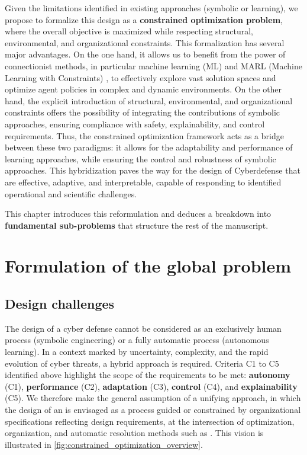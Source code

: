 Given the limitations identified in existing approaches (symbolic or learning), we propose to formalize this design as a \textbf{constrained optimization problem}, where the overall objective is maximized while respecting structural, environmental, and organizational constraints.
This formalization has several major advantages. On the one hand, it allows us to benefit from the power of connectionist methods, in particular machine learning (ML) and MARL (Machine Learning with Constraints) , to effectively explore vast solution spaces and optimize agent policies in complex and dynamic environments. On the other hand, the explicit introduction of structural, environmental, and organizational constraints offers the possibility of integrating the contributions of symbolic approaches, ensuring compliance with safety, explainability, and control requirements. Thus, the constrained optimization framework acts as a bridge between these two paradigms: it allows for the adaptability and performance of learning approaches, while ensuring the control and robustness of symbolic approaches. This hybridization paves the way for the design of Cyberdefense  that are effective, adaptive, and interpretable, capable of responding to identified operational and scientific challenges.

This chapter introduces this reformulation and deduces a breakdown into \textbf{fundamental sub-problems} that structure the rest of the manuscript.

\section{Formulation of the global problem}

\subsection{Design challenges}

The design of a cyber defense  cannot be considered as an exclusively human process (symbolic engineering) or a fully automatic process (autonomous learning). In a context marked by uncertainty, complexity, and the rapid evolution of cyber threats, a hybrid approach is required.
%
Criteria C1 to C5 identified above highlight the scope of the requirements to be met: \textbf{autonomy} (C1), \textbf{performance} (C2), \textbf{adaptation} (C3), \textbf{control} (C4), and \textbf{explainability} (C5).
%
We therefore make the general assumption of a unifying approach, in which the design of an  is envisaged as a process guided or constrained by organizational specifications reflecting design requirements, at the intersection of optimization, organization, and automatic resolution methods such as  . This vision is illustrated in \autoref{fig:constrained_optimization_overview}.

